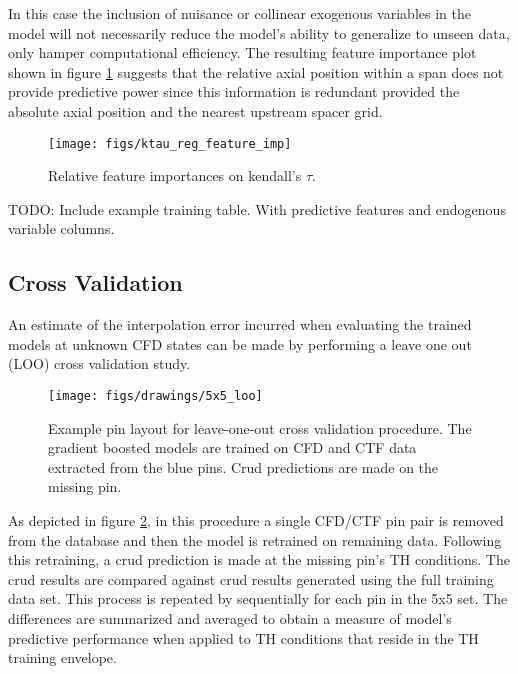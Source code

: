 In this case the inclusion of nuisance or collinear exogenous variables in the model will not necessarily reduce the model's ability to generalize to unseen data, only hamper computational efficiency.  The resulting feature importance plot shown in figure \ref{fig:ktauregfeatureimp} suggests that the relative axial position within a span does not provide predictive power since this information is redundant provided the absolute axial position and the nearest upstream spacer grid.  

\begin{figure}[H]
    \centering
    \texttt{[image: figs/ktau\_reg\_feature\_imp]}
    \caption[Relative feature importance.]{Relative feature importances on kendall's $\tau$.}
    \label{fig:ktauregfeatureimp}
\end{figure}

TODO: Include example training table.  With predictive features and endogenous variable columns.



\subsection{Cross Validation}

An estimate of the interpolation error incurred when evaluating the trained models at unknown CFD states can be made by performing a leave one out (LOO) cross validation study.

\begin{figure}[h]
    \centering
    \texttt{[image: figs/drawings/5x5\_loo]}
    \caption[Example pin layout for leave-one-out cross validation procedure.]{Example pin layout for leave-one-out cross validation procedure.  The gradient boosted models are trained on CFD and CTF data extracted from the blue pins.  Crud predictions are made on the missing pin.}
    \label{fig:5x5loo}
\end{figure}


As depicted in figure \ref{fig:5x5loo}, in this procedure a single CFD/CTF pin pair is removed from the database and then the model is retrained on remaining data.  Following this retraining, a crud prediction is made 
at the missing pin's TH conditions.  The crud results are compared against crud results generated using the full training data set.  This process is repeated by sequentially for each pin in the 5x5 set.  The differences are summarized and averaged to obtain a measure of model's predictive performance when applied to TH conditions that reside in the TH training envelope.

